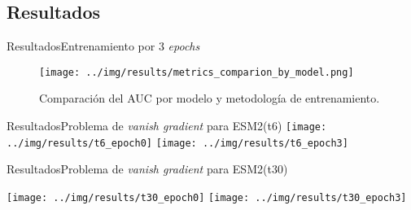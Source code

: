 \documentclass[10pt]{beamer}
\newcommand{\1}{
	\setbeamertemplate{background}{
		\texttt{[image: img/1]}
		\tikz[overlay] \fill[fill opacity=0.75,fill=white] (0,0) rectangle (-\paperwidth,\paperheight);
	}
}
\begin{document}
\subsection{Resultados}

\begin{frame}{Resultados}{Entrenamiento por 3 \textit{epochs}}
	\begin{figure}
		\centering		
		\texttt{[image: ../img/results/metrics\_comparion\_by\_model.png]}			
		\caption{Comparación del AUC por modelo y metodología de entrenamiento.}
	\end{figure}
\end{frame}


\begin{frame}{Resultados}{Problema de \textit{vanish gradient} para ESM2(t6)}
	\centering
	\texttt{[image: ../img/results/t6\_epoch0]}
	\texttt{[image: ../img/results/t6\_epoch3]}
\end{frame}

\begin{frame}{Resultados}{Problema de \textit{vanish gradient} para ESM2(t30)}
	\centering

	\texttt{[image: ../img/results/t30\_epoch0]}
	\texttt{[image: ../img/results/t30\_epoch3]}
\end{frame}
\end{document}
